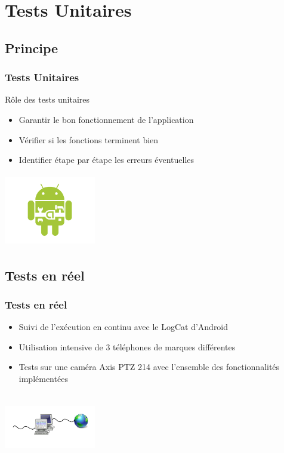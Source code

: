 \documentclass{beamer}
\begin{document}
\section{Tests Unitaires}
\subsection{Principe}
  \begin{frame}
\begin{minipage}{0.59\textwidth}
\frametitle{Tests Unitaires}
Rôle des tests unitaires
  \begin{itemize}
 \item<2-> Garantir le bon fonctionnement de l'application
    \item<3-> Vérifier si les fonctions terminent bien
    \item<4-> Identifier étape par étape les erreurs éventuelles
\end{itemize} 
\end{minipage}
\begin{minipage}{0.39\textwidth}
 \includegraphics[width=4cm, height=3.2cm]{test.png}
\end{minipage}
\end{frame}

\subsection{Tests en réel}
 \begin{frame}
\begin{minipage}{0.59\textwidth}
   \frametitle{Tests en réel}
\begin{itemize}
    \item<2-> Suivi de l'exécution en continu avec le LogCat d'Android
    \item<3-> Utilisation intensive de 3 téléphones de marques différentes
    \item<4-> Tests sur une caméra Axis PTZ 214 avec l'ensemble des
    fonctionnalités implémentées
   \end{itemize}
\end{minipage}
\begin{minipage}{0.39\textwidth}
 \includegraphics[width=4cm, height=3cm]{Wire.png}
\end{minipage}
\end{frame}
\end{document}
